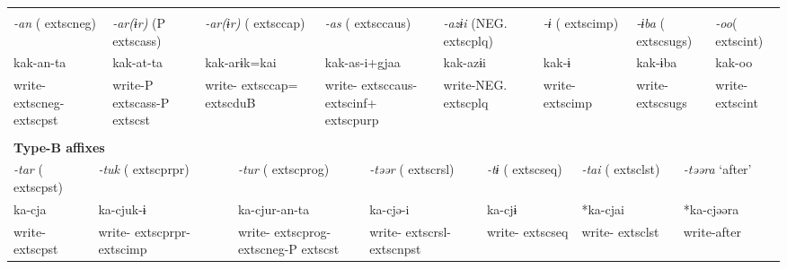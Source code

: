 \tabletail{}
\tablelasttail{}
\begin{tabularx}{\textwidth}{XXXXXXm{}XXXXXXXXXXXXXXXX}
\lsptoprule
\multicolumn{23}{X}{{\bfseries Type-A affixes}}\\
\multicolumn{3}{X}{{ \textit{{}-an} (	extsc{neg})}} & \multicolumn{4}{X}{{ \textit{{}-ar(ɨr)} (P	extsc{ass})}} & \multicolumn{3}{X}{{ \textit{{}-ar(ɨr)} (	extsc{cap})}} & \multicolumn{5}{X}{{ \textit{{}-as} (	extsc{caus})}} & \multicolumn{3}{X}{{ \textit{{}-azɨi} (NEG.	extsc{plq})}} & \multicolumn{2}{X}{{ \textit{{}-ɨ} (	extsc{imp})}} & \multicolumn{2}{X}{{ \textit{{}-ɨba} (	extsc{sugs})}} & { \textit{{}-oo}(	extsc{int})}\\
\multicolumn{3}{X}{{ kak-an-ta}} & \multicolumn{4}{X}{{ kak-at-ta}} & \multicolumn{3}{X}{{ kak-arɨk=kai}} & \multicolumn{5}{X}{{ kak-as-i+gjaa}} & \multicolumn{3}{X}{{ kak-azɨi}} & \multicolumn{2}{X}{{ kak-ɨ}} & \multicolumn{2}{X}{{ kak-ɨba}} & { kak-oo}\\
\multicolumn{3}{X}{write-	extsc{neg}-	extsc{pst}} & \multicolumn{4}{X}{write-P	extsc{ass}-P	extsc{st}} & \multicolumn{3}{X}{write-	extsc{cap}=	extsc{du}B} & \multicolumn{5}{X}{write-	extsc{caus}-	extsc{inf}+	extsc{purp}} & \multicolumn{3}{X}{write-NEG.	extsc{plq}} & \multicolumn{2}{X}{write-	extsc{imp}} & \multicolumn{2}{X}{write-	extsc{sugs}} & write-	extsc{int}\\
\multicolumn{23}{X}{}\\
\multicolumn{23}{X}{{\bfseries Type-B affixes}}\\
\multicolumn{2}{X}{{ \textit{{}-tar} (	extsc{pst})}} & \multicolumn{6}{X}{{ \textit{{}-tuk} (	extsc{prpr})}} & \multicolumn{4}{X}{{ \textit{{}-tur} (	extsc{prog})}} & \multicolumn{4}{X}{{ \textit{{}-təər} (	extsc{rsl})}} & \multicolumn{3}{X}{{ \textit{{}-tɨ} (	extsc{seq})}} & \multicolumn{2}{X}{{ \textit{{}-tai} (	extsc{lst})}} & \multicolumn{2}{X}{{ \textit{{}-təəra} ‘after’}}\\
\multicolumn{2}{X}{{ ka-cja}} & \multicolumn{6}{X}{{ ka-cjuk-ɨ}} & \multicolumn{4}{X}{{ ka-cjur-an-ta}} & \multicolumn{4}{X}{{ ka-cjə-i}} & \multicolumn{3}{X}{{ ka-cjɨ}} & \multicolumn{2}{X}{{ *ka-cjai}} & \multicolumn{2}{X}{{ *ka-cjəəra}}\\
\multicolumn{2}{X}{write-	extsc{pst}} & \multicolumn{6}{X}{write-	extsc{prpr}-	extsc{imp}} & \multicolumn{4}{X}{write-	extsc{prog}-	extsc{neg}-P	extsc{st}} & \multicolumn{4}{X}{write-	extsc{rsl}-	extsc{npst}} & \multicolumn{3}{X}{write-	extsc{seq}} & \multicolumn{2}{X}{write-	extsc{lst}} & \multicolumn{2}{X}{{ write-after}}\\

\end{tabularx}
